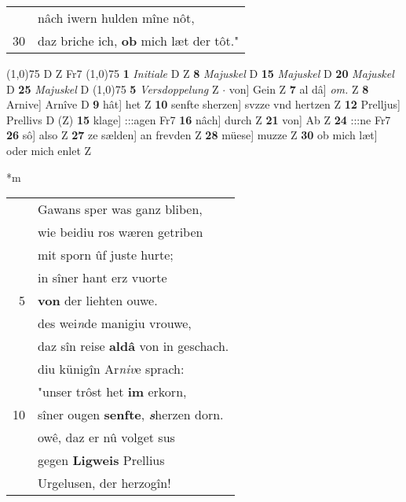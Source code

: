 \documentclass[8pt,a4paper,notitlepage]{article}
\begin{document}
\begin{table}[ht]
\begin{minipage}[t]{0.5\linewidth}
\begin{tabular}{rl}
 & nâch iwern hulden mîne nôt,\\ 
30 & daz briche ich, \textbf{ob} mich læt der tôt."\\ 
\end{tabular}
\scriptsize
\line(1,0){75} \newline
D Z Fr7 \newline
\line(1,0){75} \newline
\textbf{1} \textit{Initiale} D Z  \textbf{8} \textit{Majuskel} D  \textbf{15} \textit{Majuskel} D  \textbf{20} \textit{Majuskel} D  \textbf{25} \textit{Majuskel} D  \newline
\line(1,0){75} \newline
\textbf{5} \textit{Versdoppelung} Z   $\cdot$ von] Gein Z \textbf{7} al dâ] \textit{om.} Z \textbf{8} Arnive] Arnîve D \textbf{9} hât] het Z \textbf{10} senfte sherzen] svzze vnd hertzen Z \textbf{12} Prelljus] Prellivs D (Z) \textbf{15} klage] :::agen Fr7 \textbf{16} nâch] durch Z \textbf{21} von] Ab Z \textbf{24} :::ne Fr7 \textbf{26} sô] also Z \textbf{27} ze sælden] an frevden Z \textbf{28} müese] muzze Z \textbf{30} ob mich læt] oder mich enlet Z \newline
\end{minipage}
\hspace{0.5cm}
\begin{minipage}[t]{0.5\linewidth}
\small
\begin{center}*m
\end{center}
\begin{tabular}{rl}
 & Gawans sper was ganz bliben,\\ 
 & wie beidiu ros wæren getriben\\ 
 & mit sporn ûf juste hurte;\\ 
 & in sîner hant erz vuorte\\ 
5 & \textbf{von} der liehten ouwe.\\ 
 & des wei\textit{n}de manigiu vrouwe,\\ 
 & daz sîn reise \textbf{aldâ} von in geschach.\\ 
 & diu künigîn Ar\textit{niv}e sprach:\\ 
 & "unser trôst het \textbf{im} erkorn,\\ 
10 & sîner ougen \textbf{senfte}, \textit{\textbf{s}}herzen dorn.\\ 
 & owê, daz er nû volget sus\\ 
 & gegen \textbf{Ligweis} Prellius\\ 
 & Urgelusen, der herzogîn!\\ 

\end{tabular}
\end{minipage}
\end{table}
\end{document}
